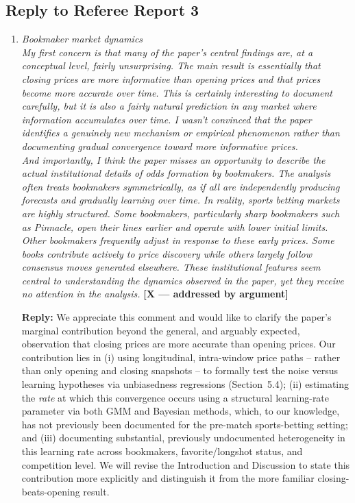 \documentclass[letterpaper,12pt]{article}
\newcounter{b}
\newcommand{\argX}{\textcolor{green!55!black}{\textbf{[X --- addressed by argument]}}}
\newcommand{\Reply}[1]{\par\noindent\textbf{Reply:} #1}
\begin{document}
\subsection*{Reply to Referee Report 3}


\begin{enumerate}
\item \textit{Bookmaker market dynamics\\[6pt]
My first concern is that many of the paper’s central findings are, at a conceptual level,
fairly unsurprising. The main result is essentially that closing prices are more informative
than opening prices and that prices become more accurate over time. This is certainly
interesting to document carefully, but it is also a fairly natural prediction in any market
where information accumulates over time. I wasn’t convinced that the paper identifies a
genuinely new mechanism or empirical phenomenon rather than documenting gradual
convergence toward more informative prices.\\[6pt]
And importantly, I think the paper misses an opportunity to describe the actual
institutional details of odds formation by bookmakers. The analysis often treats
bookmakers symmetrically, as if all are independently producing forecasts and gradually
learning over time. In reality, sports betting markets are highly structured. Some
bookmakers, particularly sharp bookmakers such as Pinnacle, open their lines earlier
and operate with lower initial limits. Other bookmakers frequently adjust in response to
these early prices. Some books contribute actively to price discovery while others largely
follow consensus moves generated elsewhere. These institutional features seem central
to understanding the dynamics observed in the paper, yet they receive no attention in the
analysis. } \argX

\Reply{We appreciate this comment and would like to clarify the paper's marginal contribution beyond the general, and arguably expected, observation that closing prices are more accurate than opening prices. Our contribution lies in (i) using longitudinal, intra-window price paths -- rather than only opening and closing snapshots -- to formally test the noise versus learning hypotheses via unbiasedness regressions (Section~5.4); (ii) estimating the \emph{rate} at which this convergence occurs using a structural learning-rate parameter via both GMM and Bayesian methods, which, to our knowledge, has not previously been documented for the pre-match sports-betting setting; and (iii) documenting substantial, previously undocumented heterogeneity in this learning rate across bookmakers, favorite/longshot status, and competition level. We will revise the Introduction and Discussion to state this contribution more explicitly and distinguish it from the more familiar closing-beats-opening result.

}
\end{enumerate}
\end{document}
